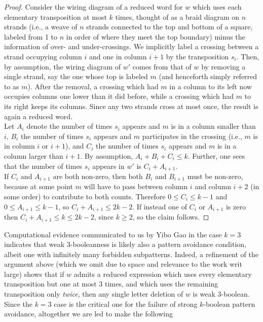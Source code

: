 \documentclass[11pt]{amsart}
\theoremstyle{definition}
\theoremstyle{remark}
\numberwithin{equation}{section}
\begin{document}
    \begin{proof}
       Consider the wiring diagram of a reduced word for $w$ which uses each elementary transposition at most $k$ times, thought of as a braid diagram on $n$ strands (i.e., a weave of $n$ strands connected to the top and bottom of a square, labeled from 1 to $n$ in order of where they meet the top boundary) minus the information of over- and under-crossings. We implicitly label a crossing between a strand occupying column $i$ and one in column $i+1$ by the transposition $s_i$. Then, by assumption, the wiring diagram of $w'$ comes from that of $w$ by removing a single strand, say the one whose top is labeled $m$ (and henceforth simply referred to as $m$). After the removal, a crossing which had $m$ in a column to its left now occupies columns one lower than it did before, while a crossing which had $m$ to its right keeps its columns. Since any two strands cross at most once, the result is again a reduced word.\\

Let $A_i$ denote the number of times $s_i$ appears and $m$ is in a column smaller than $i$, $B_i$ the number of times $s_i$ appears and $m$ participates in the crossing (i.e., $m$ is in column $i$ or $i+1$), and $C_i$ the number of times $s_i$ appears and $m$ is in a column larger than $i+1$. By assumption, $A_i + B_i + C_i \le k$. Further, one sees that the number of times $s_i$ appears in $w'$ is $C_i + A_{i+1}$.\\

If $C_i$ and $A_{i+1}$ are both non-zero, then both $B_i$ and $B_{i+1}$ must be non-zero, because at some point $m$ will have to pass between column $i$ and column $i+2$ (in some order) to contribute to both counts. Therefore $0 \le C_i \le k-1$ and $0 \le A_{i+1} \le k-1$, so $C_i + A_{i+1} \le 2k-2$. If instead one of $C_i$ or $A_{i+1}$ is zero then $C_i + A_{i+1} \le k \le 2k-2$, since $k \ge 2$, so the claim follows.
    \end{proof}
    
    Computational evidence communicated to us by Yibo Gao in the case $k = 3$ indicates that weak $3$-booleanness is likely also a pattern avoidance condition, albeit one with infinitely many forbidden subpatterns. Indeed, a refinement of the argument above (which we omit due to space and relevance to the work writ large) shows that if $w$ admits a reduced expression which uses every elementary transposition but one at most $3$ times, and which uses the remaining transposition only \textit{twice}, then any single letter deletion of $w$ is weak $3$-boolean. Since the $k = 3$ case is the critical one for the failure of strong $k$-boolean pattern avoidance, altogether we are led to make the following
    
\end{document}
